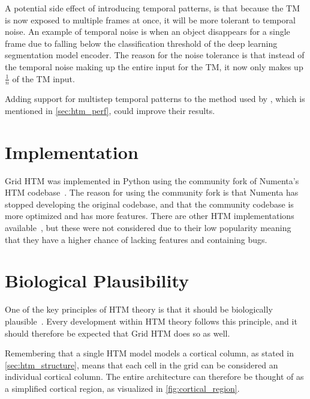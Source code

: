 \par
A potential side effect of introducing temporal patterns, is that because the TM is now exposed to multiple frames at once, it will be more tolerant to temporal noise. An example of temporal noise is when an object disappears for a single frame due to falling below the classification threshold of the deep learning segmentation model encoder. The reason for the noise tolerance is that instead of the temporal noise making up the entire input for the TM, it now only makes up $\frac{1}{n}$ of the TM input.
\par
Adding support for multistep temporal patterns to the method used by \textcite{MotionAnomalyDetection}, which is mentioned in \autoref{sec:htm_perf}, could improve their results.
\section{Implementation}
Grid HTM was implemented in Python using the community fork of Numenta's HTM codebase~\cite{htm_community_fork}. The reason for using the community fork is that Numenta has stopped developing the original codebase, and that the community codebase is more optimized and has more features. There are other HTM implementations available~\cite{htm_community_cuda,htm_community_brainblocks}, but these were not considered due to their low popularity meaning that they have a higher chance of lacking features and containing bugs.
\section{Biological Plausibility}
One of the key principles of HTM theory is that it should be biologically plausible~\cite{BAMI}. Every development within HTM theory follows this principle, and it should therefore be expected that Grid HTM does so as well.
\par
Remembering that a single HTM model models a cortical column, as stated in \autoref{sec:htm_structure}, means that each cell in the grid can be considered an individual cortical column. The entire architecture can therefore be thought of as a simplified cortical region, as visualized in \autoref{fig:cortical_region}.
